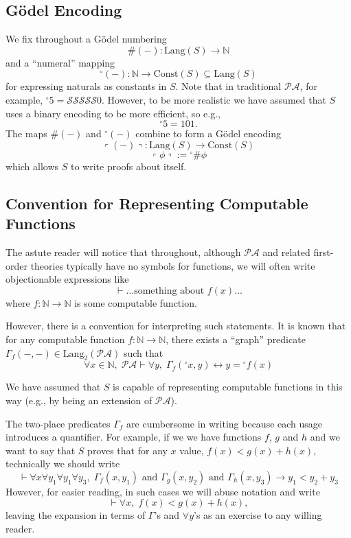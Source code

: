 \documentclass[onecolumn,authordate]{miri-tech-article}
\numberwithin{equation}{section}
\theoremstyle{definition}
\newcommand{\NN}{\mathbb{N}}
\newcommand{\Ss}{\mathcal{S}}
\newcommand{\proves}[1]{\underset{#1}{\vdash}}
\newcommand{\PA}{\mathcal{P}\!\mathcal{A}}
\newcommand{\Lang}{\mathrm{Lang}}
\newcommand{\Const}{\mathrm{Const}}
\renewcommand{\implies}{\rightarrow}
\renewcommand{\to}{\rightarrow}
\renewcommand{\iff}{\leftrightarrow}
\newcommand{\qquote}[1]{\left\ulcorner #1 \right\urcorner}
\newcommand{\numeral}{{}^\circ}
\newcommand{\AND}{{\textrm{ and }}}
\renewcommand{\-}{^{-1}}
\begin{document}
\subsection{G\"{o}del Encoding}
We fix throughout a G\"{o}del numbering
 $$\#(-) : \Lang(S) \to \NN$$
and a ``numeral'' mapping
$$\numeral(-) : \NN \to \Const(S)\subseteq \Lang(S)$$
for expressing naturals as constants in $S$.  Note that in traditional $\PA$, for example, $\numeral 5 = \Ss\Ss\Ss\Ss\Ss0$.  However, to be more realistic we have assumed that $S$ uses a binary encoding to be more efficient, so e.g.,
$$\numeral 5 = 101.$$
The maps $\#(-)$ and $\numeral(-)$ combine to form a G\"{o}del encoding
$$\qquote{(-)} : \Lang(S)\to\Const(S)$$
$$\qquote{\phi}:=\numeral \# \phi$$
which allows $S$ to write proofs about itself.

\subsection{Convention for Representing Computable Functions}\label{sec:rep}
The astute reader will notice that throughout, although $\PA$ and related first-order theories typically have no symbols for functions, we will often write objectionable expressions like
$$\proves{} \ldots \text{something about $f(x)$} \ldots$$
where $f:\NN\to\NN$ is some computable function.

However, there is a convention for interpreting such statements.  It is known \citep[see, e.g. Theorem 6.8 of][Part II]{Cori:2001} that for any computable function $f:\NN\to\NN$, there exists a ``graph'' predicate $\Gamma_f(-,-)\in\Lang_2(\PA)$ such that
%
$$\forall x\in\NN, \; \PA \proves{} \forall y, \; \Gamma_f(\numeral x,y) \iff y = \numeral f(x)$$

\noindent We have assumed that $S$ is capable of representing computable functions in this way (e.g., by being an extension of $\PA$).

The two-place predicates $\Gamma_f$ are cumbersome in writing because each usage introduces a quantifier.  For example, if we we have functions $f$, $g$ and $h$ and we want to say that $S$ proves that for any $x$ value, $f(x) < g(x) + h(x)$, technically we should write
%
$$\proves{} \forall x \forall y_1 \forall y_1 \forall y_3,\; \Gamma_f(x,y_1) \AND \Gamma_g(x,y_2)\AND \Gamma_h(x,y_3) \implies y_1 < y_2 + y_3$$
%
However, for easier reading, in such cases we will abuse notation and write
$$\proves{} \forall x, \; f(x) < g(x) + h(x),$$
leaving the expansion in terms of $\Gamma$'s and $\forall y$'s as an exercise to any willing reader.
\end{document}
